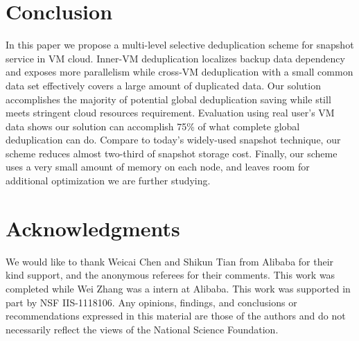 \section{Conclusion}
\label{sect:final}
In this paper we propose a multi-level selective deduplication scheme for 
snapshot service in VM cloud. 
Inner-VM deduplication localizes backup data dependency and exposes more parallelism  
while cross-VM deduplication with a small common data set
effectively  covers a large amount of duplicated data.
Our solution accomplishes the majority of
potential global deduplication saving while still meets stringent cloud resources requirement. 
Evaluation using real user's VM data shows
our solution can accomplish 75\% of what complete global
deduplication can do. 
Compare to today's widely-used snapshot technique, our scheme reduces almost
two-third of snapshot storage cost.
Finally, our scheme uses a very small amount of memory on each node, and leaves
room for additional optimization we are further studying.
\section*{Acknowledgments}
{\small
We would like to thank Weicai Chen and Shikun Tian from Alibaba for their kind support, 
and the anonymous referees for their comments.
This work was completed while Wei Zhang was a intern at Alibaba.
This work was supported in part by NSF IIS-1118106.
Any opinions, findings, and conclusions or recommendations expressed in this material are those of the authors and
do not necessarily reflect the views of the National Science Foundation.
}
 
%
%

